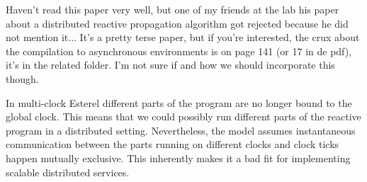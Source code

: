 Haven't read this paper very well, but one of my friends at the lab his paper about a distributed reactive propagation algorithm got rejected because he did not mention it...
It's a pretty terse paper, but if you're interested, the crux about the compilation to asynchronous environments is on page 141 (or 17 in de pdf), it's in the related folder. I'm not sure if and how we should incorporate this though. \newline

\cite{esterel} In multi-clock Esterel different parts of the program are no longer bound to the global clock. This means that we could possibly run different parts of the reactive program in a distributed setting. Nevertheless, the model assumes instantaneous communication between the parts running on different clocks and clock ticks happen mutually exclusive. This inherently makes it a bad fit for implementing scalable distributed services.


\cite{orleans}
